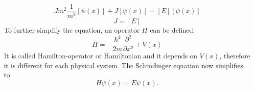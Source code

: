   \begin{equation}
		\label{eq:1d_schroedinger_units_3}
    Jm^2\frac{1}{m^2}\left[\psi(x)\right]+J\left[\psi(x)\right]=\left[E\right]\left[\psi(x)\right]
  \end{equation}
  \begin{equation}
		\label{eq:1d_schroedinger_units_4}
    J=\left[E\right]
  \end{equation}
	To further simplify the equation, an operator $H$ can be defined: 
	\begin{equation}
		\label{eq:hamilton_operator}
		H = -\frac{\hbar^2}{2m}\frac{\partial^2}{\partial x^2}+V(x)
	\end{equation}
	It is called Hamilton-operator or Hamiltonian and it depends on $V(x)$, therefore it is different for each physical system. The Schrödinger equation now simplifies to
	\begin{equation}
		\label{eq:schroedinger_with_hamilton}
		H\psi(x) = E\psi(x).
	\end{equation}
